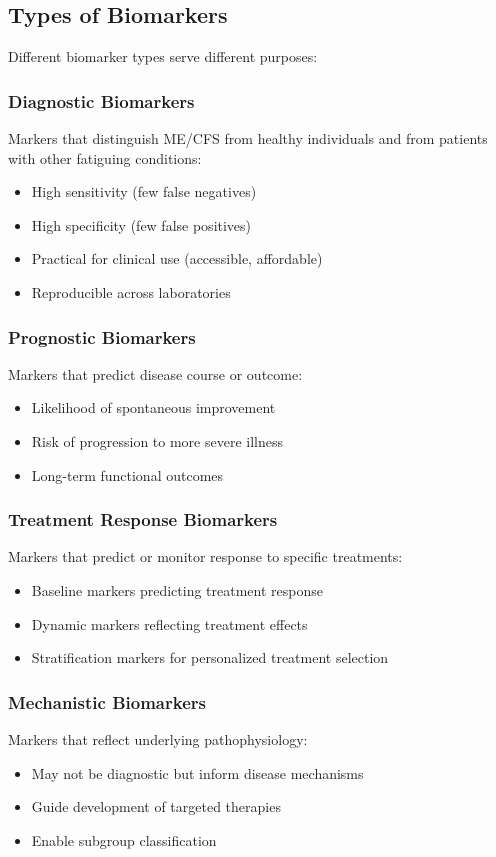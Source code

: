\subsection{Types of Biomarkers}

Different biomarker types serve different purposes:

\subsubsection{Diagnostic Biomarkers}
Markers that distinguish ME/CFS from healthy individuals and from patients with other fatiguing conditions:
\begin{itemize}
    \item High sensitivity (few false negatives)
    \item High specificity (few false positives)
    \item Practical for clinical use (accessible, affordable)
    \item Reproducible across laboratories
\end{itemize}

\subsubsection{Prognostic Biomarkers}
Markers that predict disease course or outcome:
\begin{itemize}
    \item Likelihood of spontaneous improvement
    \item Risk of progression to more severe illness
    \item Long-term functional outcomes
\end{itemize}

\subsubsection{Treatment Response Biomarkers}
Markers that predict or monitor response to specific treatments:
\begin{itemize}
    \item Baseline markers predicting treatment response
    \item Dynamic markers reflecting treatment effects
    \item Stratification markers for personalized treatment selection
\end{itemize}

\subsubsection{Mechanistic Biomarkers}
Markers that reflect underlying pathophysiology:
\begin{itemize}
    \item May not be diagnostic but inform disease mechanisms
    \item Guide development of targeted therapies
    \item Enable subgroup classification
\end{itemize}

